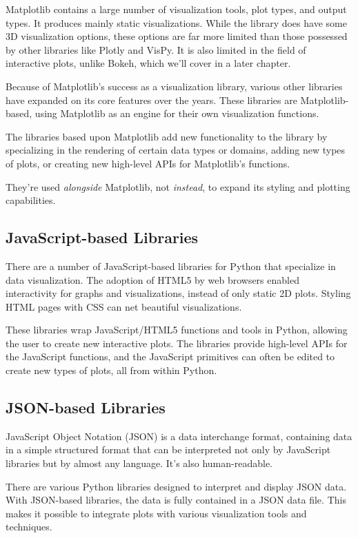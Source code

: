 \documentclass[11pt]{article}
\begin{document}
Matplotlib contains a large number of visualization tools, plot types,
and output types. It produces mainly static visualizations. While the
library does have some 3D visualization options, these options are far
more limited than those possessed by other libraries like Plotly and
VisPy. It is also limited in the field of interactive plots, unlike
Bokeh, which we'll cover in a later chapter.

Because of Matplotlib's success as a visualization library, various
other libraries have expanded on its core features over the years. These
libraries are Matplotlib-based, using Matplotlib as an engine for their
own visualization functions.

The libraries based upon Matplotlib add new functionality to the library
by specializing in the rendering of certain data types or domains,
adding new types of plots, or creating new high-level APIs for
Matplotlib's functions.

They're used \emph{alongside} Matplotlib, not \emph{instead}, to expand
its styling and plotting capabilities.

\subsection{JavaScript-based
Libraries}\label{javascript-based-libraries}

There are a number of JavaScript-based libraries for Python that
specialize in data visualization. The adoption of HTML5 by web browsers
enabled interactivity for graphs and visualizations, instead of only
static 2D plots. Styling HTML pages with CSS can net beautiful
visualizations.

These libraries wrap JavaScript/HTML5 functions and tools in Python,
allowing the user to create new interactive plots. The libraries provide
high-level APIs for the JavaScript functions, and the JavaScript
primitives can often be edited to create new types of plots, all from
within Python.

\subsection{JSON-based Libraries}\label{json-based-libraries}

JavaScript Object Notation (JSON) is a data interchange format,
containing data in a simple structured format that can be interpreted
not only by JavaScript libraries but by almost any language. It's also
human-readable.

There are various Python libraries designed to interpret and display
JSON data. With JSON-based libraries, the data is fully contained in a
JSON data file. This makes it possible to integrate plots with various
visualization tools and techniques.
\end{document}
